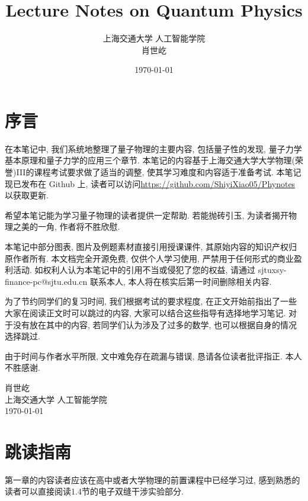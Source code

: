 \documentclass[12pt, a4paper, oneside]{report}
\title{\Huge\textbf{Lecture Notes on Quantum Physics}}
\author{\Large 上海交通大学 人工智能学院 \\
\Large 肖世屹}
\date{\today}
\theoremstyle{definition}
\theoremstyle{remark}
\begin{document}
\maketitle
\thispagestyle{empty}
\clearpage
\chapter*{序言}

在本笔记中, 我们系统地整理了量子物理的主要内容, 包括量子性的发现, 量子力学基本原理和量子力学的应用三个章节. 本笔记的内容基于上海交通大学大学物理(荣誉)III的课程考试要求做了适当的调整, 使其学习难度和内容适于准备考试. 本笔记现已发布在 Github 上, 读者可以访问\url{https://github.com/ShiyiXiao05/Phynotes}以获取更新.

希望本笔记能为学习量子物理的读者提供一定帮助. 若能抛砖引玉, 为读者揭开物理之美的一角, 作者将不胜欣慰.

本笔记中部分图表, 图片及例题素材直接引用授课课件, 其原始内容的知识产权归原作者所有. 本文档完全开源免费, 仅供个人学习使用, 严禁用于任何形式的商业盈利活动. 如权利人认为本笔记中的引用不当或侵犯了您的权益, 请通过 sjtuxsy-finance-pc@sjtu.edu.cn 联系本人, 本人将在核实后第一时间删除相关内容.

为了节约同学们的复习时间, 我们根据考试的要求程度, 在正文开始前指出了一些大家在阅读正文时可以跳过的内容, 大家可以结合这些指导有选择地学习笔记. 对于没有放在其中的内容, 若同学们认为涉及了过多的数学, 也可以根据自身的情况选择跳过.

由于时间与作者水平所限, 文中难免存在疏漏与错误, 恳请各位读者批评指正. 本人不胜感谢.

\bigskip
\begin{flushright}
肖世屹 \\
上海交通大学 人工智能学院 \\
\today
\end{flushright}
\clearpage

\tableofcontents
\clearpage


\chapter*{跳读指南}
第一章的内容读者应该在高中或者大学物理的前置课程中已经学习过, 感到熟悉的读者可以直接阅读1.4节的电子双缝干涉实验部分.
\end{document}
